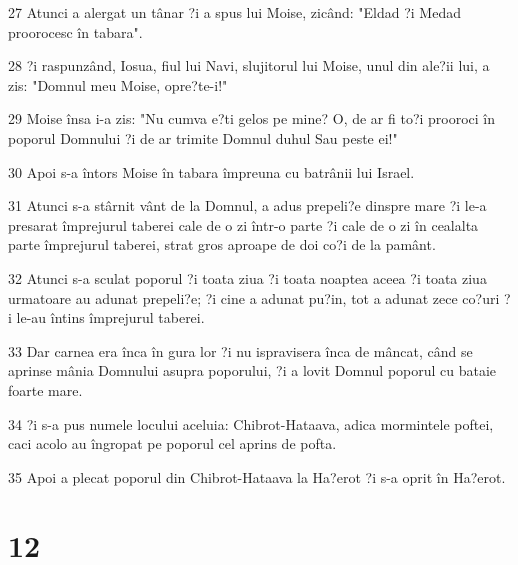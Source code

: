 \par 27 Atunci a alergat un tânar ?i a spus lui Moise, zicând: "Eldad ?i Medad proorocesc în tabara".
\par 28 ?i raspunzând, Iosua, fiul lui Navi, slujitorul lui Moise, unul din ale?ii lui, a zis: "Domnul meu Moise, opre?te-i!"
\par 29 Moise însa i-a zis: "Nu cumva e?ti gelos pe mine? O, de ar fi to?i prooroci în poporul Domnului ?i de ar trimite Domnul duhul Sau peste ei!"
\par 30 Apoi s-a întors Moise în tabara împreuna cu batrânii lui Israel.
\par 31 Atunci s-a stârnit vânt de la Domnul, a adus prepeli?e dinspre mare ?i le-a presarat împrejurul taberei cale de o zi într-o parte ?i cale de o zi în cealalta parte împrejurul taberei, strat gros aproape de doi co?i de la pamânt.
\par 32 Atunci s-a sculat poporul ?i toata ziua ?i toata noaptea aceea ?i toata ziua urmatoare au adunat prepeli?e; ?i cine a adunat pu?in, tot a adunat zece co?uri ?i le-au întins împrejurul taberei.
\par 33 Dar carnea era înca în gura lor ?i nu ispravisera înca de mâncat, când se aprinse mânia Domnului asupra poporului, ?i a lovit Domnul poporul cu bataie foarte mare.
\par 34 ?i s-a pus numele locului aceluia: Chibrot-Hataava, adica mormintele poftei, caci acolo au îngropat pe poporul cel aprins de pofta.
\par 35 Apoi a plecat poporul din Chibrot-Hataava la Ha?erot ?i s-a oprit în Ha?erot.

\chapter{12}

